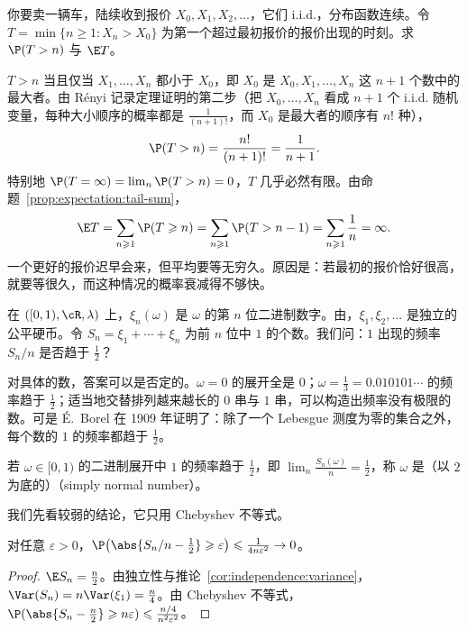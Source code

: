 \begin{workedexample}[等待一个更好的报价]\label{we:independence:better-offer}
你要卖一辆车，陆续收到报价 $X_0,X_1,X_2,\dots$，它们 i.i.d.，分布函数连续。令 $T=\min\{n\geqslant1:X_n>X_0\}$ 为第一个超过最初报价的报价出现的时刻。求 $\P(T>n)$ 与 $\E T$。
\end{workedexample}
\begin{solution}
$T>n$ 当且仅当 $X_1,\dots,X_n$ 都小于 $X_0$，即 $X_0$ 是 $X_0,X_1,\dots,X_n$ 这 $n+1$ 个数中的最大者。由 Rényi 记录定理证明的第二步（把 $X_0,\dots,X_n$ 看成 $n+1$ 个 i.i.d. 随机变量，每种大小顺序的概率都是 $\frac1{(n+1)!}$，而 $X_0$ 是最大者的顺序有 $n!$ 种），
\[
\P(T>n)=\frac{n!}{(n+1)!}=\frac1{n+1}.
\]
特别地 $\P(T=\infty)=\lim_n\P(T>n)=0$，$T$ 几乎必然有限。由命题~\ref{prop:expectation:tail-sum}，
\[
\E T=\sum_{n\geqslant1}\P(T\geqslant n)=\sum_{n\geqslant1}\P(T>n-1)=\sum_{n\geqslant1}\frac1n=\infty .
\]
一个更好的报价迟早会来，但平均要等无穷久。原因是：若最初的报价恰好很高，就要等很久，而这种情况的概率衰减得不够快。
\end{solution}


在 $([0,1),\cR,\lambda)$ 上，$\xi_n(\omega)$ 是 $\omega$ 的第 $n$ 位二进制数字。由，$\xi_1,\xi_2,\dots$ 是独立的公平硬币。令 $S_n=\xi_1+\cdots+\xi_n$ 为前 $n$ 位中 $1$ 的个数。我们问：$1$ 出现的频率 $S_n/n$ 是否趋于 $\frac12$？

对具体的数，答案可以是否定的。$\omega=0$ 的展开全是 $0$；$\omega=\frac13=0.010101\cdots$ 的频率趋于 $\frac12$；适当地交替排列越来越长的 $0$ 串与 $1$ 串，可以构造出频率没有极限的数。可是 É.\ Borel 在 1909 年证明了：除了一个 Lebesgue 测度为零的集合之外，每个数的 $1$ 的频率都趋于 $\frac12$。

\begin{definition}[正规数]\label{def:independence:normal}
若 $\omega\in[0,1)$ 的二进制展开中 $1$ 的频率趋于 $\frac12$，即 $\lim_n\frac{S_n(\omega)}n=\frac12$，称 $\omega$ 是（以 $2$ 为底的）（simply normal number）。
\end{definition}

我们先看较弱的结论，它只用 Chebyshev 不等式。

\begin{proposition}\label{prop:independence:bernoulli}
对任意 $\varepsilon>0$，$\P\bigl(\abs{S_n/n-\frac12}\geqslant\varepsilon\bigr)\leqslant\frac1{4n\varepsilon^2}\to0$。
\end{proposition}
\begin{proof}
$\E S_n=\frac n2$。由独立性与推论~\ref{cor:independence:variance}，$\Var(S_n)=n\Var(\xi_1)=\frac n4$。由 Chebyshev 不等式，$\P(\abs{S_n-\frac n2}\geqslant n\varepsilon)\leqslant\frac{n/4}{n^2\varepsilon^2}$。
\end{proof}


